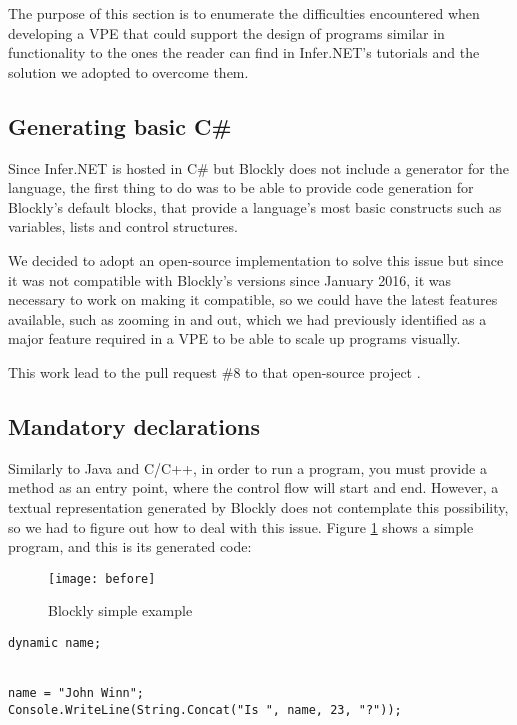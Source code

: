 The purpose of this section is to enumerate the difficulties encountered when
developing a VPE that could support the design of programs similar in functionality
to the ones the reader can find in Infer.NET's tutorials \cite{InferNET14t} and
the solution we adopted to overcome them.

\subsection{Generating basic C#}

Since Infer.NET is hosted in C# but Blockly does not include a generator for
the language, the first thing to do was to be able to provide code generation for
Blockly's default blocks, that provide a language's most basic constructs such
as variables, lists and control structures.

We decided to adopt an open-source implementation to solve this issue \cite{csgen}
but since it was not compatible with Blockly's versions since January 2016, it
was necessary to work on making it compatible, so we could have the latest features
available, such as zooming in and out, which we had previously identified as a
major feature required in a VPE to be able to scale up programs visually.

This work lead to the pull request \#8 to that open-source project \cite{csgenpr}.

\subsection{Mandatory declarations}

Similarly to Java and C/C++, in order to run a program, you must provide a method
as an entry point, where the control flow will start and end. However, a textual
representation generated by Blockly does not contemplate this possibility, so
we had to figure out how to deal with this issue. Figure \ref{fig:before} shows a simple program,
and this is its generated code:

\begin{figure}[t]
  \begin{center}
    \leavevmode
    \texttt{[image: before]}
    \caption{Blockly simple example}
    \label{fig:before}
  \end{center}
\end{figure}

\begin{lstlisting}
dynamic name;


name = "John Winn";
Console.WriteLine(String.Concat("Is ", name, 23, "?"));
\end{lstlisting}

